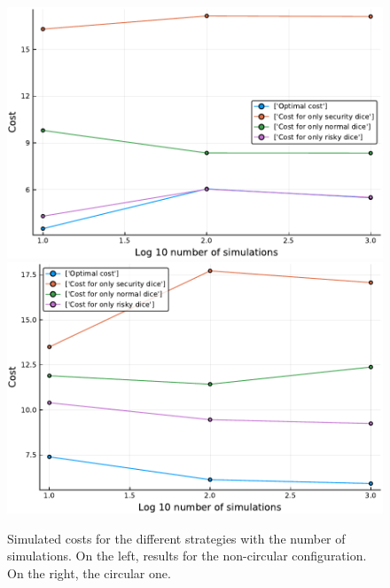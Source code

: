 \begin{figure}[H]
\centering
\includegraphics[scale=0.41]{../img/board_magic/cost_subopt_log_noncirc.pdf}
\includegraphics[scale=0.41]{../img/board_magic/cost_subopt_log_circ.pdf}
\caption{Simulated costs for the different strategies with the number of simulations. On the left, results for the non-circular configuration. On the right, the circular one.}
\label{fig:cost_subopt_log_magic}
\end{figure}

